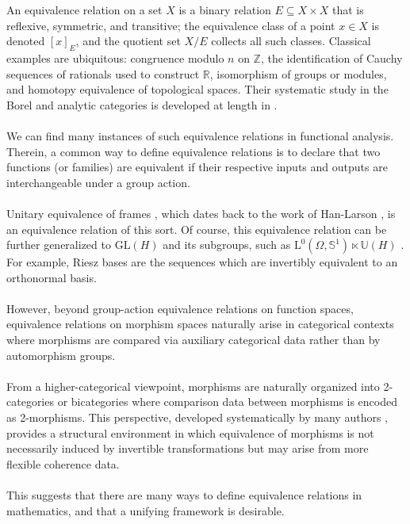 \documentclass[a4paper,10pt]{article}
\theoremstyle{plain}
\theoremstyle{definition}
\theoremstyle{remark}
\begin{document}
An equivalence relation on a set $X$ is a binary relation
$E \subseteq X \times X$ that is reflexive, symmetric, and transitive;
the equivalence class of a point $x \in X$ is denoted $[x]_E$,
and the quotient set $X/E$ collects all such classes.
Classical examples are ubiquitous: congruence modulo $n$ on $\mathbb{Z}$, the identification of Cauchy sequences of rationals used to construct
$\mathbb{R}$, isomorphism of groups or modules, and homotopy equivalence of topological spaces. Their systematic study in the Borel and analytic categories is developed at length in \cite{Kanoveui2008}. \\ \\
We can find many instances of such equivalence relations in functional analysis. Therein, a common way to define equivalence relations is to declare that two functions (or families) are equivalent if their respective inputs and outputs are interchangeable under a group action. \\ \\
Unitary equivalence of frames \cite{Christensen2016}, which dates back to the work of Han-Larson \cite{HanLarson2000}, is an equivalence relation of this sort. Of course, this equivalence relation can be further generalized to $\text{GL}(H)$ \cite{Balan1999} and its subgroups, such as $\text{L}^0(\Omega,\mathbb{S}^1) \ltimes \mathbb{U}(H)$ \cite{NovikovSevostyanova2002}. For example, Riesz bases are the sequences which are invertibly equivalent to an orthonormal basis. \\ \\
However, beyond group-action equivalence relations on function spaces, equivalence relations on morphism spaces naturally arise in categorical contexts where morphisms are compared via auxiliary categorical data rather than by automorphism groups. \\ \\
From a higher-categorical viewpoint, morphisms are naturally organized into 2-categories or bicategories where comparison data between morphisms is encoded as 2-morphisms. This perspective, developed systematically by many authors \cite{Benabou1967, Leinster2004}, provides a structural environment in which equivalence of morphisms is not necessarily induced by invertible transformations but may arise from more flexible coherence data. \\ \\
This suggests that there are many ways to define equivalence relations in mathematics, and that a unifying framework is desirable. \\ \\
\end{document}

